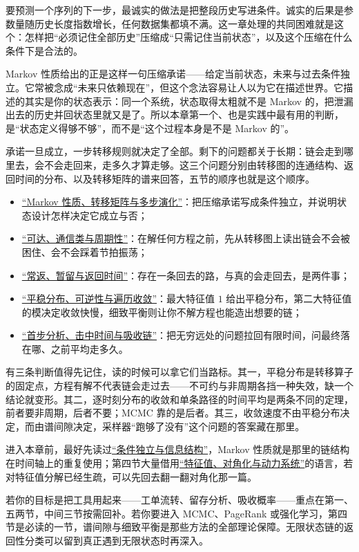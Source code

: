要预测一个序列的下一步，最诚实的做法是把整段历史写进条件。诚实的后果是参数量随历史长度指数增长，任何数据集都填不满。这一章处理的共同困难就是这个：怎样把``必须记住全部历史''压缩成``只需记住当前状态''，以及这个压缩在什么条件下是合法的。

Markov 性质给出的正是这样一句压缩承诺——给定当前状态，未来与过去条件独立。它常被念成``未来只依赖现在''，但这个念法容易让人以为它在描述世界。它描述的其实是你的状态表示：同一个系统，状态取得太粗就不是 Markov 的，把泄漏出去的历史并回状态里就又是了。所以本章第一个、也是实践中最有用的判断，是``状态定义得够不够''，而不是``这个过程本身是不是 Markov 的''。

承诺一旦成立，一步转移规则就决定了全部。剩下的问题都关于长期：链会走到哪里去，会不会走回来，走多久才算走够。这三个问题分别由转移图的连通结构、返回时间的分布、以及转移矩阵的谱来回答，五节的顺序也就是这个顺序。

\begin{itemize}
\tightlist
\item \hyperref[sec:06-Random-Processes/03-Markov-Chains/01]{``Markov 性质、转移矩阵与多步演化''}：把压缩承诺写成条件独立，并说明状态设计怎样决定它成立与否；
\item \hyperref[sec:06-Random-Processes/03-Markov-Chains/02]{``可达、通信类与周期性''}：在解任何方程之前，先从转移图上读出链会不会被困住、会不会踩着节拍振荡；
\item \hyperref[sec:06-Random-Processes/03-Markov-Chains/03]{``常返、暂留与返回时间''}：存在一条回去的路，与真的会走回去，是两件事；
\item \hyperref[sec:06-Random-Processes/03-Markov-Chains/04]{``平稳分布、可逆性与遍历收敛''}：最大特征值 \(1\) 给出平稳分布，第二大特征值的模决定收敛快慢，细致平衡则让你不解方程也能造出想要的链；
\item \hyperref[sec:06-Random-Processes/03-Markov-Chains/05]{``首步分析、击中时间与吸收链''}：把无穷远处的问题拉回有限时间，问最终落在哪、之前平均走多久。
\end{itemize}

有三条判断值得先记住，读的时候可以拿它们当路标。其一，平稳分布是转移算子的固定点，方程有解不代表链会走过去——不可约与非周期各挡一种失效，缺一个结论就变形。其二，逐时刻分布的收敛和单条路径的时间平均是两条不同的定理，前者要非周期，后者不要；MCMC 靠的是后者。其三，收敛速度不由平稳分布决定，而由谱间隙决定，采样器``跑够了没有''这个问题的答案藏在那里。

进入本章前，最好先读过\hyperref[sec:05-Probability/02-Conditional-Probability/04]{``条件独立与信息结构''}，Markov 性质就是那里的链结构在时间轴上的重复使用；第四节大量借用\hyperref[ch:020]{``特征值、对角化与动力系统''}的语言，若对特征值分解已经生疏，可以先回去翻一翻对角化那一篇。

若你的目标是把工具用起来——工单流转、留存分析、吸收概率——重点在第一、五两节，中间三节按需回补。若你要进入 MCMC、PageRank 或强化学习，第四节是必读的一节，谱间隙与细致平衡是那些方法的全部理论保障。无限状态链的返回性分类可以留到真正遇到无限状态时再深入。
